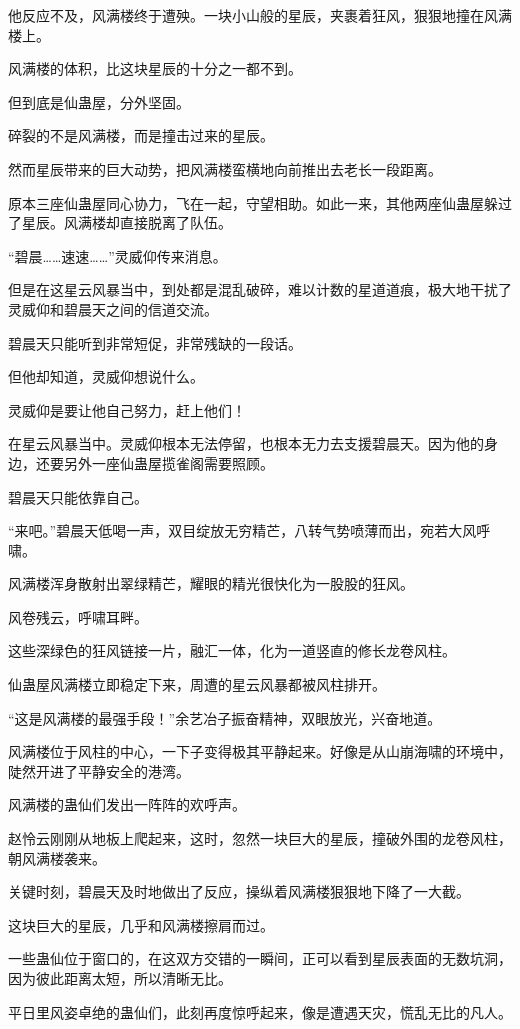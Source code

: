 \begin{this_body}
他反应不及，风满楼终于遭殃。一块小山般的星辰，夹裹着狂风，狠狠地撞在风满楼上。

风满楼的体积，比这块星辰的十分之一都不到。

但到底是仙蛊屋，分外坚固。

碎裂的不是风满楼，而是撞击过来的星辰。

然而星辰带来的巨大动势，把风满楼蛮横地向前推出去老长一段距离。

原本三座仙蛊屋同心协力，飞在一起，守望相助。如此一来，其他两座仙蛊屋躲过了星辰。风满楼却直接脱离了队伍。

“碧晨……速速……”灵威仰传来消息。

但是在这星云风暴当中，到处都是混乱破碎，难以计数的星道道痕，极大地干扰了灵威仰和碧晨天之间的信道交流。

碧晨天只能听到非常短促，非常残缺的一段话。

但他却知道，灵威仰想说什么。

灵威仰是要让他自己努力，赶上他们！

在星云风暴当中。灵威仰根本无法停留，也根本无力去支援碧晨天。因为他的身边，还要另外一座仙蛊屋揽雀阁需要照顾。

碧晨天只能依靠自己。

“来吧。”碧晨天低喝一声，双目绽放无穷精芒，八转气势喷薄而出，宛若大风呼啸。

风满楼浑身散射出翠绿精芒，耀眼的精光很快化为一股股的狂风。

风卷残云，呼啸耳畔。

这些深绿色的狂风链接一片，融汇一体，化为一道竖直的修长龙卷风柱。

仙蛊屋风满楼立即稳定下来，周遭的星云风暴都被风柱排开。

“这是风满楼的最强手段！”余艺冶子振奋精神，双眼放光，兴奋地道。

风满楼位于风柱的中心，一下子变得极其平静起来。好像是从山崩海啸的环境中，陡然开进了平静安全的港湾。

风满楼的蛊仙们发出一阵阵的欢呼声。

赵怜云刚刚从地板上爬起来，这时，忽然一块巨大的星辰，撞破外围的龙卷风柱，朝风满楼袭来。

关键时刻，碧晨天及时地做出了反应，操纵着风满楼狠狠地下降了一大截。

这块巨大的星辰，几乎和风满楼擦肩而过。

一些蛊仙位于窗口的，在这双方交错的一瞬间，正可以看到星辰表面的无数坑洞，因为彼此距离太短，所以清晰无比。

平日里风姿卓绝的蛊仙们，此刻再度惊呼起来，像是遭遇天灾，慌乱无比的凡人。


\end{this_body}
